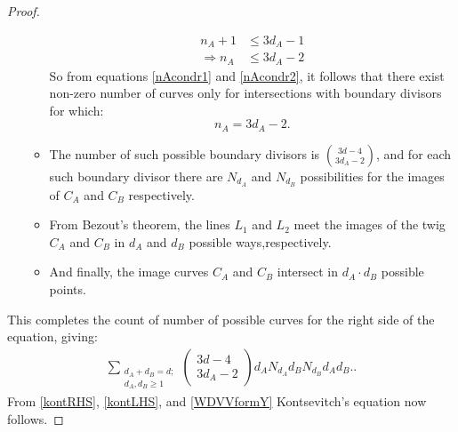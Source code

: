 \begin{proof}
\begin{enumerate}
\begin{itemize}
                    \begin{align}
                        n_{A} + 1 &\leq 3d_{A} -1 \\
                        \Rightarrow n_{A} &\leq 3d_{A} - 2 \label{nAcondr2} 
                    \end{align}
                    So from equations \ref{nAcondr1} and \ref{nAcondr2}, it follows that there exist non-zero number of curves only for intersections with boundary divisors for which:
                    \begin{equation*}
                        n_{A} = 3d_{A} - 2.
                    \end{equation*}
                \item The number of such possible boundary divisors is $\binom{3d-4}{3d_{A}-2}$, and for each such boundary divisor there are $N_{d_{A}}$ and $N_{d_{B}}$ possibilities for the images of $C_{A}$ and $C_{B}$ respectively.
                \item From Bezout's theorem, the lines $L_{1}$ and $L_{2}$ meet the images of the twig $C_{A}$ and $C_{B}$ in $d_{A}$ and $d_{B}$ possible ways,respectively.
                \item And finally, the image curves $C_{A}$ and $C_{B}$ intersect in $d_{A}\cdot d_{B}$ possible points.
            \end{itemize}
    \end{enumerate}
    This completes the count of number of possible curves for the right side of the equation, giving:
    \begin{align}
        \sum_{\substack{d_{A}+d_{B} = d;\\ d_{A},d_{B} \geq 1}}
        \begin{pmatrix}
        3d-4\\
        3d_{A} - 2
        \end{pmatrix} d_{A} N_{d_{A}}  d_{B} N_{d_{B}}  d_{A} d_{B}.\label{kontRHS}.
    \end{align} 
    From \ref{kontRHS}, \ref{kontLHS}, and \ref{WDVVformY} Kontsevitch's equation now follows.
\end{proof}
